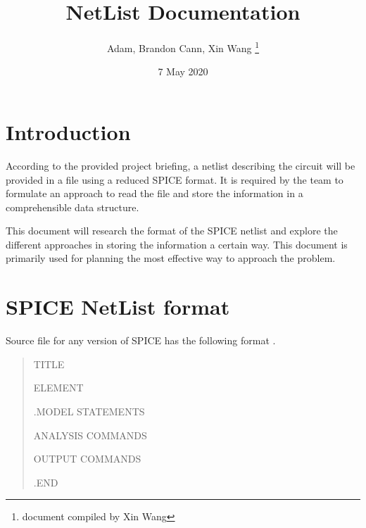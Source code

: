\documentclass[a4paper, titlepage]{article}
\title{NetList Documentation}
\author{Adam, Brandon Cann, Xin Wang \thanks{document compiled by Xin Wang}}
\date{7 May 2020}
\begin{document}
    \maketitle
    \tableofcontents
    \pagebreak
    \noindent
    \section{Introduction}
    According to the provided project briefing, a netlist describing the circuit will be provided in a file using a reduced SPICE format. It is required by the team to formulate an approach to read the file and store the information in a comprehensible data structure. 
    \par
    \noindent
    This document will research the format of the SPICE netlist and explore the different approaches in storing the information a certain way. This document is primarily used for planning the most effective way to approach the problem. 
    
    \section{SPICE NetList format}
    Source file for any version of SPICE has the following format \cite{spice}.
    \begin{quotation}
        {\selectfont
            TITLE \par
            ELEMENT \par
            .MODEL STATEMENTS \par
            ANALYSIS COMMANDS \par
            OUTPUT COMMANDS \par
            .END \par
        }
    \end{quotation}

    \pagebreak
    \printbibliography[title={References}]
\end{document}
